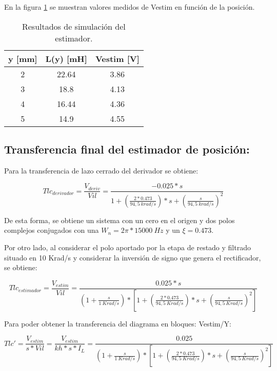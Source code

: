 \noindent En la figura \ref{tab_Resultados_de_simulación_del_estimador} se muestran valores medidos de Vestim en funci\'{o}n de la posici\'{o}n.

\begin{table}[H]
	\begin{center}
		\begin{tabular}{| c | c | c |}
			\hline
		y [mm] & L(y) [mH] & Vestim [V] \\ \hline 
		2 & 22.64 & 3.86 \\ \hline 
		3 & 18.8 & 4.13 \\ \hline 
		4 & 16.44 & 4.36 \\ \hline 
		5 & 14.9 & 4.55 \\ \hline 
		\end{tabular}
		\caption{Resultados de simulación del estimador.}
		\label{tab_Resultados_de_simulación_del_estimador}
	\end{center}
\end{table}

\subsection{Transferencia final del estimador de posici\'{o}n:}

\noindent Para la transferencia de lazo cerrado del derivador se obtiene:

\begin{equation} \label{eq_TLC_deriv_1}
	{Tlc}_{derivador}=\frac{V_{deriv}}{Vil}=\frac{-0.025*s}{1+(\frac{2*0.473}{94,5\ krad/s})*s+(\frac{s}{94,5\ krad/s})^2}
\end{equation}

\noindent De esta forma, se obtiene un sistema con un cero en el origen y dos polos complejos conjugados con una $W_n=2\pi *15000\ Hz$ y un $\xi =0.473$.

\noindent Por otro lado, al considerar el polo aportado por la etapa de restado y filtrado situado en 10 Krad/s y considerar la inversi\'{o}n de signo que genera el rectificador, se obtiene:

\begin{equation} \label{eq_TLC_deriv_2}
	{Tlc}_{estimador}=\frac{V_{estim}}{Vil}=\frac{0.025*s}{(1+\frac{s}{1\ Krad/s})*[1+(\frac{2*0.473}{94,5\ Krad/s})*s+(\frac{s}{94,5\ Krad/s})^2]}
\end{equation}

\noindent Para poder obtener la transferencia del diagrama en bloques: Vestim/Y:

\begin{equation} \label{eq_TLC_deriv_3}
	{Tlc'}=\frac{V_{estim}}{s*Vil}=\frac{V_{estim}}{kh*s*I_L}=\frac{0.025}{(1+\frac{s}{1\ Krad/s})*[1+(\frac{2*0.473}{94,5\ Krad/s})*s+(\frac{s}{94,5\ Krad/s})^2]}
\end{equation}

